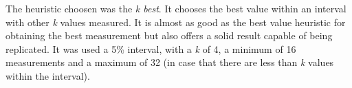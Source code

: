 The heuristic choosen was the \textit{k best}. It chooses the best value within an interval with other \textit{k} values measured. It is almost as good as the best value heuristic for obtaining the best measurement but also offers a solid result capable of being replicated. It was used a 5\% interval, with a \textit{k} of 4, a minimum of 16 measurements and a maximum of 32 (in case that there are less than \textit{k} values within the interval).